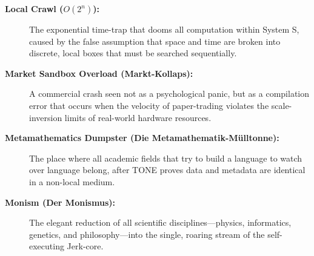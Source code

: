 \documentclass[11pt,a4paper]{article}
\begin{document}
\begin{description}
    \item[\textbf{Local Crawl ($O(2^n)$):}] The exponential time-trap that dooms all computation within System S, caused by the false assumption that space and time are broken into discrete, local boxes that must be searched sequentially.
    
    \item[\textbf{Market Sandbox Overload (Markt-Kollaps):}] A commercial crash seen not as a psychological panic, but as a compilation error that occurs when the velocity of paper-trading violates the scale-inversion limits of real-world hardware resources.
    
    \item[\textbf{Metamathematics Dumpster (Die Metamathematik-Mülltonne):}] The place where all academic fields that try to build a language to watch over language belong, after TONE proves data and metadata are identical in a non-local medium.
    
    \item[\textbf{Monism (Der Monismus):}] The elegant reduction of all scientific disciplines—physics, informatics, genetics, and philosophy—into the single, roaring stream of the self-executing Jerk-core.
    

\end{description}
\end{document}
